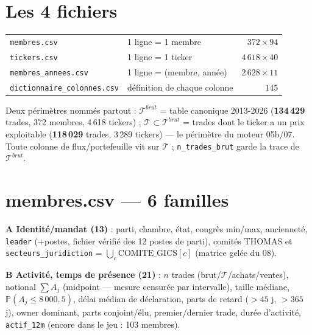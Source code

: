 \documentclass[10pt,a4paper,twocolumn]{article}
\begin{document}

\section{Les 4 fichiers}
\begin{center}\small
\begin{tabularx}{\linewidth}{@{}lXr@{}}
\toprule
\texttt{membres.csv} & 1 ligne = 1 membre & $372 \times 94$ \\
\texttt{tickers.csv} & 1 ligne = 1 ticker & $4\,618 \times 40$ \\
\texttt{membres\_annees.csv} & 1 ligne = (membre, année) & $2\,628 \times 11$ \\
\texttt{dictionnaire\_colonnes.csv} & définition de chaque colonne & $145$ \\
\bottomrule
\end{tabularx}
\end{center}
Deux périmètres nommés partout : $\mathcal{T}^{brut}$ = table canonique 2013-2026
(\textbf{134\,429} trades, 372 membres, 4\,618 tickers) ; $\mathcal{T} \subset \mathcal{T}^{brut}$ =
trades dont le ticker a un prix exploitable (\textbf{118\,029} trades, 3\,289 tickers) --- le périmètre
du moteur 05b/07. Toute colonne de flux/portefeuille vit sur $\mathcal{T}$ ;
\texttt{n\_trades\_brut} garde la trace de $\mathcal{T}^{brut}$.

\section{membres.csv --- 6 familles}
\textbf{A Identité/mandat (13)} : parti, chambre, état, congrès min/max, ancienneté,
\texttt{leader} (+postes, fichier vérifié des 12 postes de parti), comités THOMAS et
\texttt{secteurs\_juridiction} = $\bigcup_c \mathrm{COMITE\_GICS}[c]$ (matrice gelée du 08).

\textbf{B Activité, temps de présence (21)} : $n$ trades (brut/$\mathcal{T}$/achats/ventes),
notional $\sum A_j$ (midpoint --- mesure censurée par intervalle), taille médiane,
$\mathbb{P}(A_j \le 8\,000{,}5)$, délai médian de déclaration, parts de retard ($>45$ j, $>365$ j),
owner dominant, parts conjoint/élu, premier/dernier trade, durée d'activité,
\texttt{actif\_12m} (\og encore dans le jeu\fg{} : 103 membres).
\end{document}
